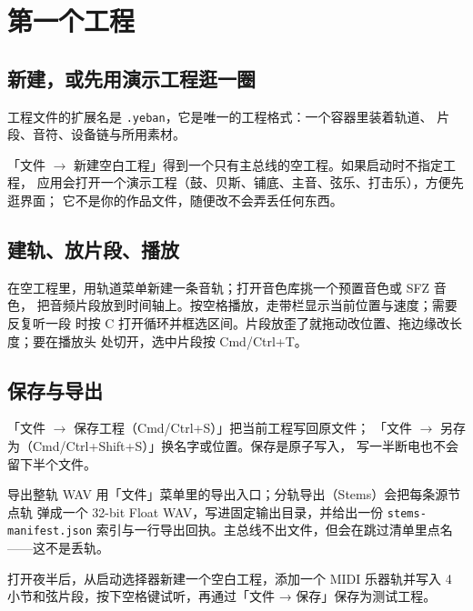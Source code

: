 \section{第一个工程}

\subsection{新建，或先用演示工程逛一圈}

工程文件的扩展名是 \texttt{.yeban}，它是唯一的工程格式：一个容器里装着轨道、
片段、音符、设备链与所用素材。

「文件 $\to$ 新建空白工程」得到一个只有主总线的空工程。如果启动时不指定工程，
应用会打开一个演示工程（鼓、贝斯、铺底、主音、弦乐、打击乐），方便先逛界面；
它不是你的作品文件，随便改不会弄丢任何东西。

\subsection{建轨、放片段、播放}

在空工程里，用轨道菜单新建一条音轨；打开音色库挑一个预置音色或 SFZ 音色，
把音频片段放到时间轴上。按空格播放，走带栏显示当前位置与速度；需要反复听一段
时按 C 打开循环并框选区间。片段放歪了就拖动改位置、拖边缘改长度；要在播放头
处切开，选中片段按 Cmd/Ctrl+T。


\subsection{保存与导出}

「文件 $\to$ 保存工程（Cmd/Ctrl+S）」把当前工程写回原文件；
「文件 $\to$ 另存为（Cmd/Ctrl+Shift+S）」换名字或位置。保存是原子写入，
写一半断电也不会留下半个文件。

导出整轨 WAV 用「文件」菜单里的导出入口；分轨导出（Stems）会把每条源节点轨
弹成一个 32-bit Float WAV，写进固定输出目录，并给出一份 \texttt{stems-manifest.json}
索引与一行导出回执。主总线不出文件，但会在跳过清单里点名——这不是丢轨。



\begin{exercise}
打开夜半后，从启动选择器新建一个空白工程，添加一个 MIDI 乐器轨并写入 4 小节和弦片段，按下空格键试听，再通过「文件 → 保存」保存为测试工程。
\end{exercise}

